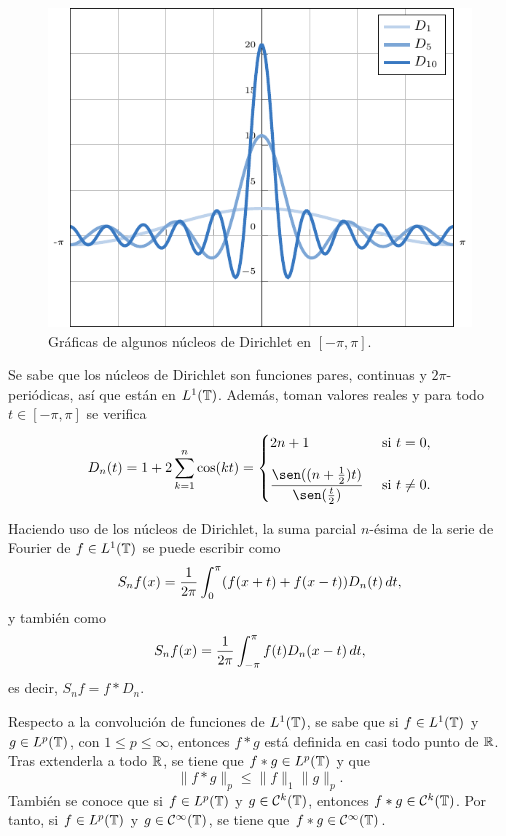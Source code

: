 \documentclass[a4paper, 12pt]{book}
\begin{document}
\begin{figure}[H]
  \centering
  \includegraphics{./plot13/main.pdf}
  \caption{Gráficas de algunos núcleos de Dirichlet en $[-\pi,\pi]$.}
\end{figure}

Se sabe que los núcleos de Dirichlet son funciones pares, continuas y $2\pi$-periódicas, así que están en $L^1(\mathbb T)$. Además, toman valores reales y para todo $t \in [-\pi,\pi]$ se verifica
\[D_n(t) = 1+2\sum_{k=1}^n \cos(kt) = \begin{cases}
    2n+1 & $ si $ t = 0, \\[10pt]
    \displaystyle\frac{\sen((n+\frac{1}{2})t)}{\sen(\frac{t}{2})} & $ si $ t \neq 0.
\end{cases}\]

Haciendo uso de los núcleos de Dirichlet, la suma parcial $n$-ésima de la serie de Fourier de $f \in L^1(\mathbb T)$ se puede escribir como
\begin{equation}\label{1.2.3}
    S_nf(x) = \frac{1}{2\pi}\int_{0}^{\pi} (f(x+t)+f(x-t))D_n(t) \, dt,
\end{equation}
y también como
\begin{equation}\label{1.2.4}
    S_nf(x) = \frac{1}{2\pi}\int_{-\pi}^{\pi} f(t)D_n(x-t) \, dt,
\end{equation}
es decir, $S_nf = f \ast D_n$.

Respecto a la convolución de funciones de $L^1(\mathbb T)$, se sabe que si $f \in L^1(\mathbb T)$ y $g \in L^p(\mathbb T)$, con $1 \leq p \leq \infty$, entonces $f \ast g$ está definida en casi todo punto de $\mathbb R$. Tras extenderla a todo $\mathbb R$, se tiene que $f \ast g \in L^p(\mathbb T)$ y que
\[\|f \ast g\|_p \leq \|f\|_1\|g\|_p.\]
También se conoce que si $f \in L^p(\mathbb T)$ y $g \in \mathcal{C}^k(\mathbb T)$, entonces $f \ast g \in \mathcal{C}^k(\mathbb T)$. Por tanto, si $f \in L^p(\mathbb T)$ y $g \in \mathcal{C}^\infty(\mathbb T)$, se tiene que $f \ast g \in \mathcal{C}^\infty(\mathbb T)$.
\end{document}
